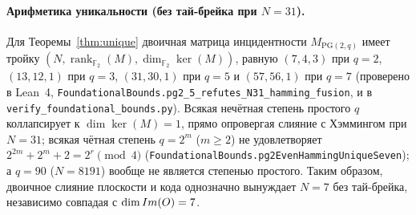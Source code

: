 \paragraph{Арифметика уникальности (без тай-брейка при $N=31$).}
Для Теоремы~\ref{thm:unique} двоичная матрица инцидентности $M_{\mathrm{PG}(2,q)}$
имеет тройку $(N, \operatorname{rank}_{\mathbb{F}_2}(M), \dim_{\mathbb{F}_2}\ker(M))$,
равную $(7,4,3)$ при $q=2$, $(13,12,1)$ при $q=3$, $(31,30,1)$ при $q=5$ и
$(57,56,1)$ при $q=7$ (проверено в Lean~4,
\texttt{FoundationalBounds.pg2\_5\_refutes\_N31\_hamming\_fusion}, и в
\texttt{verify\_foundational\_bounds.py}). Всякая нечётная степень простого $q$
коллапсирует к $\dim\ker(M)=1$, прямо опровергая слияние с Хэммингом при
$N=31$; всякая чётная степень $q=2^m$ ($m\ge 2$) не удовлетворяет
$2^{2m}+2^m+2=2^r\pmod 4$ (\texttt{FoundationalBounds.pg2EvenHammingUniqueSeven});
а $q=90$ ($N=8191$) вообще не является степенью простого. Таким образом,
двоичное слияние плоскости и кода однозначно вынуждает $N=7$ без тай-брейка,
независимо совпадая с $\dim Im(O)=7$.
